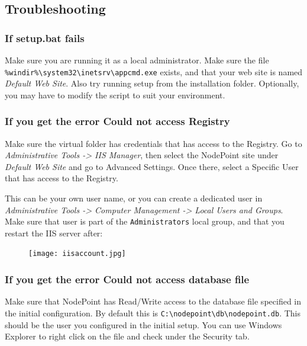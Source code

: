 \documentclass[11pt]{article}
\begin{document}
\subsection{Troubleshooting}

{
\subsubsection{If setup.bat fails}

Make sure you are running it as a local administrator. Make sure the file \texttt{\%windir\%\textbackslash system32\textbackslash inetsrv\textbackslash appcmd.exe} exists, and that your web site is named \textit{Default Web Site}. Also try running setup from the installation folder. Optionally, you may have to modify the script to suit your environment.

\subsubsection{If you get the error Could not access Registry}

Make sure the virtual folder has credentials that has access to the Registry. Go to \textit{Administrative Tools -> IIS Manager}, then select the NodePoint site under \textit{Default Web Site} and go to Advanced Settings. Once there, select a Specific User that has access to the Registry.

This can be your own user name, or you can create a dedicated user in \textit{Administrative Tools -> Computer Management -> Local Users and Groups}. Make sure that user is part of the \texttt{Administrators} local group, and that you restart the IIS server after:

\begin{figure}[h]
\texttt{[image: iisaccount.jpg]}
\end{figure}

\subsubsection{If you get the error Could not access database file}

Make sure that NodePoint has Read/Write access to the database file specified in the initial configuration. By default this is \texttt{C:\textbackslash nodepoint\textbackslash db\textbackslash nodepoint.db}. This should be the user you configured in the initial setup. You can use Windows Explorer to right click on the file and check under the Security tab.

}
\end{document}
